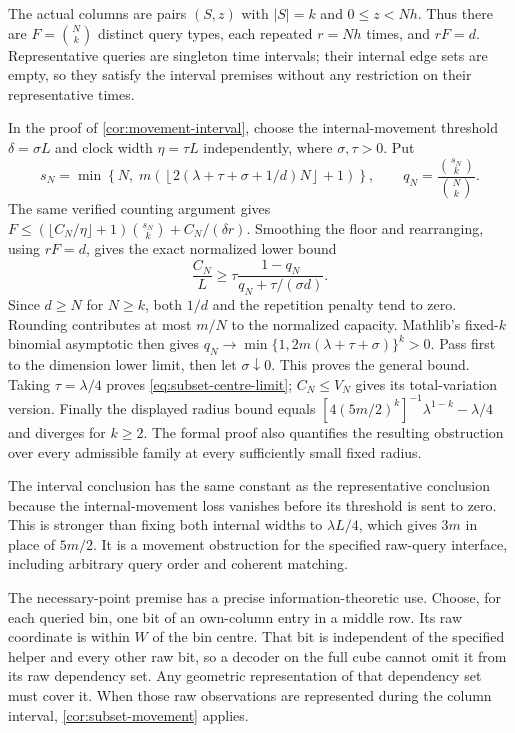 \begin{outline}
The actual columns are pairs $(S,z)$ with $|S|=k$ and $0\le z<Nh$.
Thus there are $F=\binom Nk$ distinct query types, each repeated $r=Nh$
times, and $rF=d$. Representative queries are singleton time intervals;
their internal edge sets are empty, so they satisfy the interval premises
without any restriction on their representative times.

In the proof of \cref{cor:movement-interval}, choose the internal-movement
threshold $\delta=\sigma L$ and clock width $\eta=\tau L$ independently,
where $\sigma,\tau>0$. Put
\[
 s_N=\min\left\{N,\;m\left(\left\lfloor
           2(\lambda+\tau+\sigma+1/d)N\right\rfloor+1\right)\right\},
 \qquad q_N=\frac{\binom{s_N}{k}}{\binom Nk}.
\]
The same verified counting argument gives
$F\le(\lfloor C_N/\eta\rfloor+1)\binom{s_N}{k}+C_N/(\delta r)$.
Smoothing the floor and rearranging, using $rF=d$, gives the exact
normalized lower bound
\[
 \frac{C_N}{L}\ge
 \tau\frac{1-q_N}{q_N+\tau/(\sigma d)}.
\]
Since $d\ge N$ for $N\ge k$, both $1/d$ and the repetition penalty tend
to zero. Rounding contributes at most $m/N$ to the normalized capacity.
Mathlib's fixed-$k$ binomial asymptotic then gives
$q_N\to\min\{1,2m(\lambda+\tau+\sigma)\}^k>0$.
Pass first to the dimension lower limit, then let $\sigma\downarrow0$.
This proves the general bound. Taking $\tau=\lambda/4$ proves
\cref{eq:subset-centre-limit}; $C_N\le V_N$ gives its total-variation
version. Finally the displayed radius bound equals
$[4(5m/2)^k]^{-1}\lambda^{1-k}-\lambda/4$ and diverges for $k\ge2$.
The formal proof also quantifies the resulting obstruction over every
admissible family at every sufficiently small fixed radius.
\end{outline}

The interval conclusion has the same constant as the representative
conclusion because the internal-movement loss vanishes before its
threshold is sent to zero. This is stronger than fixing both internal
widths to $\lambda L/4$, which gives $3m$ in place of $5m/2$.
It is a movement obstruction for the specified raw-query interface,
including arbitrary query order and coherent matching.

The necessary-point premise has a precise information-theoretic use.
Choose, for each queried bin, one bit of an own-column entry in a middle
row.  Its raw coordinate is within $W$ of the bin centre.  That bit is
independent of the specified helper and every other raw bit, so a
decoder on the full cube cannot omit it from its raw dependency set.
Any geometric representation of that dependency set must cover it.
When those raw observations are represented during the column interval,
\cref{cor:subset-movement} applies.

